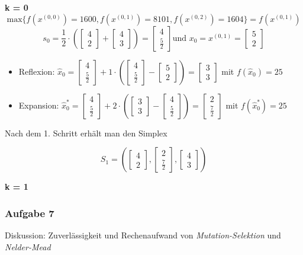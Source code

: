 \documentclass[a4paper, 12pt]{report}
\begin{document}
\textbf{k = 0}\\
$$\text{max}\{f(x^{(0,0)}) = 1600, f(x^{(0,1)}) = 8101, f(x^{(0,2)}) = 1604\} = f(x^{(0,1)})$$
$$s_0 = \frac{1}{2}\cdot (\begin{bmatrix}4\\2\end{bmatrix} + \begin{bmatrix}4\\3\end{bmatrix}) = \begin{bmatrix}4\\\frac{5}{2}\end{bmatrix} \text{und } x_0 = x^{(0,1)} = \begin{bmatrix}5\\2\end{bmatrix}$$
\begin{itemize}
\item Reflexion: $\hat x_0 = \begin{bmatrix}4\\\frac{5}{2}\end{bmatrix} + 1\cdot(\begin{bmatrix}4\\\frac{5}{2}\end{bmatrix} - \begin{bmatrix}5\\2\end{bmatrix}) = \begin{bmatrix}3\\3\end{bmatrix}$ mit $f(\hat x_0) = 25$
\item Expansion: $\hat x_0^* = \begin{bmatrix}4\\\frac{5}{2}\end{bmatrix} + 2\cdot (\begin{bmatrix}3\\3\end{bmatrix} - \begin{bmatrix}4\\\frac{5}{2}\end{bmatrix}) = \begin{bmatrix}2\\\frac{7}{2}\end{bmatrix}$ mit $f(\hat x_0^*) = 25$
\end{itemize}

Nach dem 1. Schritt erhält man den Simplex

$$S_1 = (\begin{bmatrix}4\\2\end{bmatrix}, \begin{bmatrix}2\\\frac{7}{2}\end{bmatrix}, \begin{bmatrix}4\\3\end{bmatrix})$$

\textbf{k = 1}\\
  \subsubsection{Aufgabe 7}
Diskussion: Zuverlässigkeit und Rechenaufwand von \textit{Mutation-Selektion} und \textit{Nelder-Mead}
\end{document}
